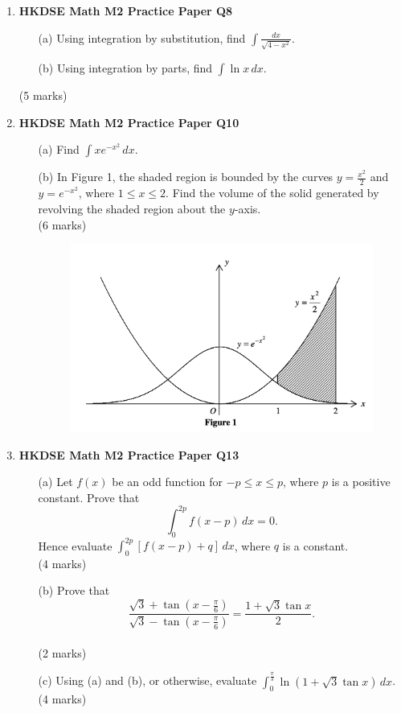 \documentclass{report}
\begin{document}
\begin{enumerate}
	\newpage

	\item \textbf{HKDSE Math M2 Practice Paper Q8}
	\begin{enumerate}
		\item [(a)]Using integration by substitution, find $\displaystyle\int\frac{dx}{\sqrt{4-x^2}}$. 
		\item [(b)]Using integration by parts, find $\displaystyle\int\ln{x}\,dx$.
	\end{enumerate}
	(5 marks)

	\item \textbf{HKDSE Math M2 Practice Paper Q10}
	\begin{enumerate}
		\item [(a)]Find $\displaystyle\int xe^{-x^2} \,dx$. 
		\item [(b)]In Figure 1, the shaded region is bounded by the curves $y = \displaystyle\frac{x^2}{2}$ and $y = e^{-x^2}$, where $1 \leq x \leq 2$. Find the volume of the solid generated by revolving the shaded region about the $y$-axis.\\
	(6 marks)
		\begin{figure}[H]
			\centering
			\includegraphics[width = .5\linewidth]{PPFigure1}
		\end{figure}
	\end{enumerate}

	\item \textbf{HKDSE Math M2 Practice Paper Q13}
	\begin{enumerate}
		\item[(a)]Let $f(x)$ be an odd function for $-p \leq x \leq p$, where $p$ is a positive constant.
		Prove that $$\displaystyle\int_0^{2p} f(x-p)\,dx = 0.$$
		Hence evaluate $\displaystyle\int_0^{2p} [f(x-p)+q]\,dx $, where $q$ is a constant. \\(4 marks)
		\item[(b)]Prove that $$\displaystyle\frac{\sqrt{3} + \tan{\left(x - \displaystyle\frac{\pi}{6}\right)}}{\sqrt{3} - \tan{\left(x - \displaystyle\frac{\pi}{6}\right)}} = \frac{1+\sqrt{3}\tan{x}}{2}.$$ \\(2 marks)
		\item[(c)]Using (a) and (b), or otherwise, evaluate $\displaystyle\int_0^{\tfrac{\pi}{3}} \ln{(1 + \sqrt{3}\tan{x})} \,dx$. \\(4 marks)
	\end{enumerate}


\end{enumerate}
\end{document}
